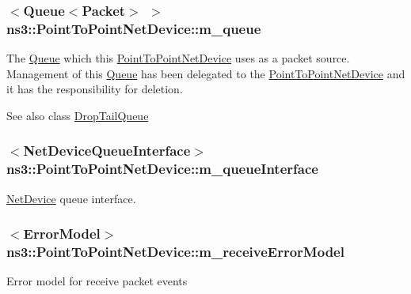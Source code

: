 \subsubsection[{\texorpdfstring{m\+\_\+queue}{m_queue}}]{$<${\bf Queue}$<${\bf Packet}$>$ $>$ ns3\+::\+Point\+To\+Point\+Net\+Device\+::m\+\_\+queue\hspace{0.3cm}{\ttfamily [private]}}\hypertarget{classns3_1_1PointToPointNetDevice_accb023eb99ce542c5a33bb5e79b7c2eb}{}\label{classns3_1_1PointToPointNetDevice_accb023eb99ce542c5a33bb5e79b7c2eb}
The \hyperlink{classns3_1_1Queue}{Queue} which this \hyperlink{classns3_1_1PointToPointNetDevice}{Point\+To\+Point\+Net\+Device} uses as a packet source. Management of this \hyperlink{classns3_1_1Queue}{Queue} has been delegated to the \hyperlink{classns3_1_1PointToPointNetDevice}{Point\+To\+Point\+Net\+Device} and it has the responsibility for deletion. \begin{DoxySeeAlso}{See also}
class \hyperlink{classns3_1_1DropTailQueue}{Drop\+Tail\+Queue} 
\end{DoxySeeAlso}
\subsubsection[{\texorpdfstring{m\+\_\+queue\+Interface}{m_queueInterface}}]{$<${\bf Net\+Device\+Queue\+Interface}$>$ ns3\+::\+Point\+To\+Point\+Net\+Device\+::m\+\_\+queue\+Interface\hspace{0.3cm}{\ttfamily [private]}}\hypertarget{classns3_1_1PointToPointNetDevice_a1999d3a69056c1a75aa67278982dfdfd}{}\label{classns3_1_1PointToPointNetDevice_a1999d3a69056c1a75aa67278982dfdfd}


\hyperlink{classns3_1_1NetDevice}{Net\+Device} queue interface. 

\subsubsection[{\texorpdfstring{m\+\_\+receive\+Error\+Model}{m_receiveErrorModel}}]{$<${\bf Error\+Model}$>$ ns3\+::\+Point\+To\+Point\+Net\+Device\+::m\+\_\+receive\+Error\+Model\hspace{0.3cm}{\ttfamily [private]}}\hypertarget{classns3_1_1PointToPointNetDevice_a685e60184c60bf96abc011081e1d589b}{}\label{classns3_1_1PointToPointNetDevice_a685e60184c60bf96abc011081e1d589b}
Error model for receive packet events 
